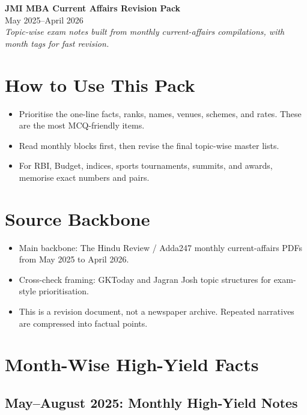 \documentclass[10pt,a4paper]{article}
\begin{document}
\begin{center}
    {\LARGE \textbf{JMI MBA Current Affairs Revision Pack}}\\
    {\large May 2025--April 2026}\\
    \vspace{2mm}
    \textit{Topic-wise exam notes built from monthly current-affairs compilations, with month tags for fast revision.}
\end{center}

\section{How to Use This Pack}
\begin{itemize}
    \item Prioritise the one-line facts, ranks, names, venues, schemes, and rates. These are the most MCQ-friendly items.
    \item Read monthly blocks first, then revise the final topic-wise master lists.
    \item For RBI, Budget, indices, sports tournaments, summits, and awards, memorise exact numbers and pairs.
\end{itemize}

\section{Source Backbone}
\begin{itemize}
    \item Main backbone: The Hindu Review / Adda247 monthly current-affairs PDFs from May 2025 to April 2026.
    \item Cross-check framing: GKToday and Jagran Josh topic structures for exam-style prioritisation.
    \item This is a revision document, not a newspaper archive. Repeated narratives are compressed into factual points.
\end{itemize}

\section{Month-Wise High-Yield Facts}

\subsection{May--August 2025: Monthly High-Yield Notes}
\end{document}
